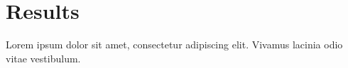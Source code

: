 \documentclass{article}
\begin{document}
\section{Results}
Lorem ipsum dolor sit amet, consectetur adipiscing elit. Vivamus lacinia odio vitae vestibulum.

\lipsum[1]
\end{document}
